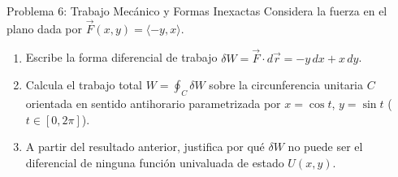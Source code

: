 \documentclass[11pt,letterpaper]{article}
\begin{document}
\begin{infobox}{Problema 6: Trabajo Mecánico y Formas Inexactas}
Considera la fuerza en el plano dada por $\vec{F}(x, y) = \langle -y, x \rangle$.
\begin{enumerate}[label=(\alph*)]
    \item Escribe la forma diferencial de trabajo $\delta W = \vec{F} \cdot d\vec{r} = -y\,dx + x\,dy$.
    \item Calcula el trabajo total $W = \oint_C \delta W$ sobre la circunferencia unitaria $C$ orientada en sentido antihorario parametrizada por $x = \cos t$, $y = \sin t$ ($t \in [0, 2\pi]$).
    \item A partir del resultado anterior, justifica por qué $\delta W$ no puede ser el diferencial de ninguna función univaluada de estado $U(x, y)$.
\end{enumerate}
\end{infobox}
\end{document}

